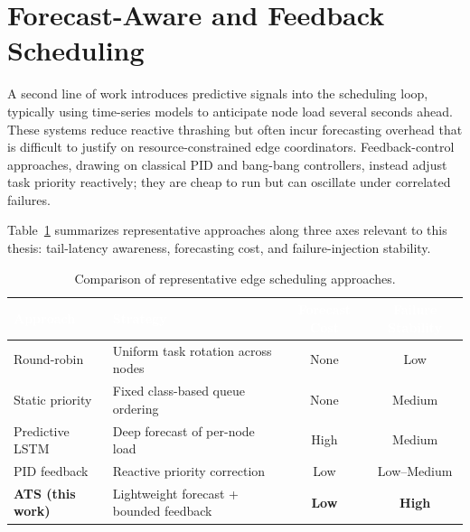 \section{Forecast-Aware and Feedback Scheduling}

A second line of work introduces predictive signals into the scheduling
loop, typically using time-series models to anticipate node load several
seconds ahead. These systems reduce reactive thrashing but often incur
forecasting overhead that is difficult to justify on resource-constrained
edge coordinators. Feedback-control approaches, drawing on classical PID
and bang-bang controllers, instead adjust task priority reactively; they
are cheap to run but can oscillate under correlated failures.

Table~\ref{tab:related} summarizes representative approaches along three
axes relevant to this thesis: tail-latency awareness, forecasting cost,
and failure-injection stability.

\begin{table}[h]
\centering
\caption{Comparison of representative edge scheduling approaches.}
\label{tab:related}
\begin{tabularx}{\textwidth}{@{}l X c c@{}}
\toprule
\rowcolor{yonseiblue}
\textcolor{white}{\textbf{Approach}} & \textcolor{white}{\textbf{Strategy}} & \textcolor{white}{\textbf{Forecast Cost}} & \textcolor{white}{\textbf{Failure Stability}}\\
\midrule
Round-robin & Uniform task rotation across nodes & None & Low\\
Static priority & Fixed class-based queue ordering & None & Medium\\
\rowcolor{paletint}
Predictive LSTM & Deep forecast of per-node load & High & Medium\\
PID feedback & Reactive priority correction & Low & Low--Medium\\
\rowcolor{paletint}
\textbf{ATS (this work)} & Lightweight forecast + bounded feedback & \textbf{Low} & \textbf{High}\\
\bottomrule
\end{tabularx}
\end{table}
